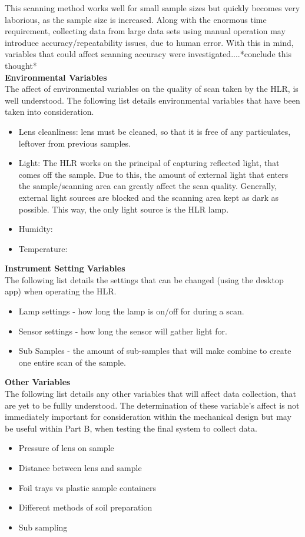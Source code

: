 \documentclass{UoNMCHA}
\numberwithin{equation}{section}
\begin{document}
This scanning method works well for small sample sizes but quickly becomes very laborious, as the sample size is increased. Along with the enormous time requirement, collecting data from large data sets using manual operation may introduce accuracy/repeatability issues, due to human error. With this in mind, variables that could affect scanning accuracy were investigated....*conclude this thought*\\
\textbf{Environmental Variables}\\
The affect of environmental variables on the quality of scan taken by the HLR, is well understood. The following list details environmental variables that have been taken into consideration.
\begin{itemize}
	\item Lens cleanliness: lens must be cleaned, so that it is free of any particulates, leftover from previous samples.
	\item Light: The HLR works on the principal of capturing reflected light, that comes off the sample. Due to this, the amount of external light that enters the sample/scanning area can greatly affect the scan quality. Generally, external light sources are blocked and the scanning area kept as dark as possible. This way, the only light source is the HLR lamp.
	\item Humidty:
	\item Temperature: 
\end{itemize}
\textbf{Instrument Setting Variables}\\
The following list details the settings that can be changed (using the desktop app) when operating the HLR.
\begin{itemize}
	\item Lamp settings - how long the lamp is on/off for during a scan.
	\item Sensor settings - how long the sensor will gather light for.
	\item Sub Samples - the amount of sub-samples that will make combine to create one entire scan of the sample.
\end{itemize}
\textbf{Other Variables}\\
The following list details any other variables that will affect data collection, that are yet to be fullly understood. The determination of these variable’s affect is not immediately important for consideration within the mechanical design but may be useful within Part B, when testing the final system to collect data.\\
\begin{itemize}
	\item Pressure of lens on sample
	\item Distance between lens and sample
	\item Foil trays vs plastic sample containers
	\item Different methods of soil preparation
	\item Sub sampling 
\end{itemize}
\end{document}
